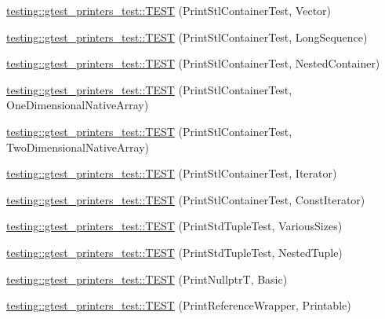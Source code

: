 \begin{DoxyCompactItemize}
\item 
\mbox{\hyperlink{namespacetesting_1_1gtest__printers__test_abfab1ea62f0285c0cdbcca500be0dac8}{testing\+::gtest\+\_\+printers\+\_\+test\+::\+T\+E\+ST}} (Print\+Stl\+Container\+Test, Vector)
\item 
\mbox{\hyperlink{namespacetesting_1_1gtest__printers__test_a55eca253f3365ad26183bcc711cb257a}{testing\+::gtest\+\_\+printers\+\_\+test\+::\+T\+E\+ST}} (Print\+Stl\+Container\+Test, Long\+Sequence)
\item 
\mbox{\hyperlink{namespacetesting_1_1gtest__printers__test_ad8fb463805baecdfb95154dec6ec4f27}{testing\+::gtest\+\_\+printers\+\_\+test\+::\+T\+E\+ST}} (Print\+Stl\+Container\+Test, Nested\+Container)
\item 
\mbox{\hyperlink{namespacetesting_1_1gtest__printers__test_a6dd59bbdea483f662fe62e2c55c106ce}{testing\+::gtest\+\_\+printers\+\_\+test\+::\+T\+E\+ST}} (Print\+Stl\+Container\+Test, One\+Dimensional\+Native\+Array)
\item 
\mbox{\hyperlink{namespacetesting_1_1gtest__printers__test_aca371c218e2248562ed258eaf385f4d1}{testing\+::gtest\+\_\+printers\+\_\+test\+::\+T\+E\+ST}} (Print\+Stl\+Container\+Test, Two\+Dimensional\+Native\+Array)
\item 
\mbox{\hyperlink{namespacetesting_1_1gtest__printers__test_a01ec32faf0032f9fbcf4895d8d6e4aa9}{testing\+::gtest\+\_\+printers\+\_\+test\+::\+T\+E\+ST}} (Print\+Stl\+Container\+Test, Iterator)
\item 
\mbox{\hyperlink{namespacetesting_1_1gtest__printers__test_a3b54f9a039804190b7ff2e818169c0f2}{testing\+::gtest\+\_\+printers\+\_\+test\+::\+T\+E\+ST}} (Print\+Stl\+Container\+Test, Const\+Iterator)
\item 
\mbox{\hyperlink{namespacetesting_1_1gtest__printers__test_a4546860bd002446294bfb5b854be8cbb}{testing\+::gtest\+\_\+printers\+\_\+test\+::\+T\+E\+ST}} (Print\+Std\+Tuple\+Test, Various\+Sizes)
\item 
\mbox{\hyperlink{namespacetesting_1_1gtest__printers__test_a323c7a67d4e8247285991b37ee6bef4e}{testing\+::gtest\+\_\+printers\+\_\+test\+::\+T\+E\+ST}} (Print\+Std\+Tuple\+Test, Nested\+Tuple)
\item 
\mbox{\hyperlink{namespacetesting_1_1gtest__printers__test_ad4fb0ad917ed8dfb5f6a966a9ad05847}{testing\+::gtest\+\_\+printers\+\_\+test\+::\+T\+E\+ST}} (Print\+NullptrT, Basic)
\item 
\mbox{\hyperlink{namespacetesting_1_1gtest__printers__test_a5de1467a5a6c9f996345b7f2dec1467d}{testing\+::gtest\+\_\+printers\+\_\+test\+::\+T\+E\+ST}} (Print\+Reference\+Wrapper, Printable)

\end{DoxyCompactItemize}
